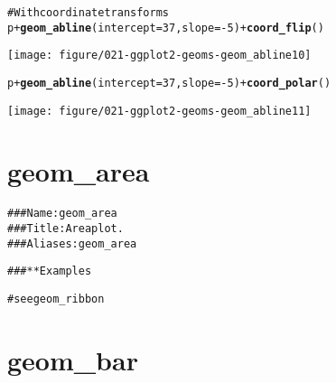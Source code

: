 \documentclass[a4paper,titlepage]{tufte-handout}\usepackage{graphicx, color}
\makeatletter
\def\maxwidth{ %
  \ifdim\Gin@nat@width>\linewidth
    \linewidth
  \else
    \Gin@nat@width
  \fi
}
\newcommand{\hlfunctioncall}[1]{\textcolor[rgb]{0.501960784313725,0,0.329411764705882}{\textbf{#1}}}%
\newcommand{\hlcomment}[1]{\textcolor[rgb]{0.180392156862745,0.6,0.341176470588235}{#1}}%
\newenvironment{kframe}{%
 \def\at@end@of@kframe{}%
 \ifinner\ifhmode%
  \def\at@end@of@kframe{\end{minipage}}%
  \begin{minipage}{\columnwidth}%
 \fi\fi%
 \def\FrameCommand##1{\hskip\@totalleftmargin \hskip-\fboxsep
 \colorbox{shadecolor}{##1}\hskip-\fboxsep
     \hskip-\linewidth \hskip-\@totalleftmargin \hskip\columnwidth}%
 \MakeFramed {\advance\hsize-\width
   \@totalleftmargin\z@ \linewidth\hsize
   \@setminipage}}%
 {\par\unskip\endMakeFramed%
 \at@end@of@kframe}
\newenvironment{knitrout}{}{} %
\makeatother
\begin{document}
\begin{knitrout}
\begin{kframe}
\begin{alltt}
\hlcomment{# With coordinate transforms}
p + \hlfunctioncall{geom_abline}(intercept = 37, slope = -5) + \hlfunctioncall{coord_flip}()
\end{alltt}
\end{kframe}
\texttt{[image: figure/021-ggplot2-geoms-geom\_abline10]} 
\begin{kframe}\begin{alltt}
p + \hlfunctioncall{geom_abline}(intercept = 37, slope = -5) + \hlfunctioncall{coord_polar}()
\end{alltt}
\end{kframe}
\texttt{[image: figure/021-ggplot2-geoms-geom\_abline11]} 
\begin{kframe}\begin{alltt}


\end{alltt}
\end{kframe}
\end{knitrout}



\section{geom\_area}

\begin{knitrout}
\color{fgcolor}\begin{kframe}
\begin{alltt}
\hlcomment{### Name: geom_area}
\hlcomment{### Title: Area plot.}
\hlcomment{### Aliases: geom_area}

\hlcomment{### ** Examples}

\hlcomment{# see geom_ribbon}



\end{alltt}
\end{kframe}
\end{knitrout}



\section{geom\_bar}
\end{document}
